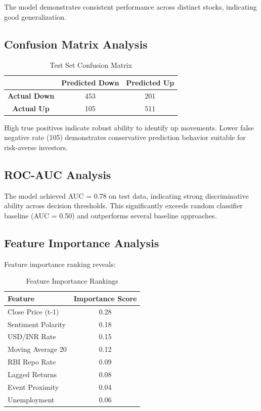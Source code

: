 \documentclass[conference]{IEEEtran}
\begin{document}
The model demonstrates consistent performance across distinct stocks, indicating good generalization.

\subsection{Confusion Matrix Analysis}

\begin{table}[!h]
\centering
\begin{tabular}{c|cc}
& \textbf{Predicted Down} & \textbf{Predicted Up} \\
\midrule
\textbf{Actual Down} & 453 & 201 \\
\textbf{Actual Up} & 105 & 511 \\
\end{tabular}
\caption{Test Set Confusion Matrix}
\label{tab:confusion}
\end{table}

High true positives indicate robust ability to identify up movements. Lower false negative rate (105) demonstrates conservative prediction behavior suitable for risk-averse investors.

\subsection{ROC-AUC Analysis}

The model achieved AUC = 0.78 on test data, indicating strong discriminative ability across decision thresholds. This significantly exceeds random classifier baseline (AUC = 0.50) and outperforms several baseline approaches.

\subsection{Feature Importance Analysis}

Feature importance ranking reveals:

\begin{table}[!h]
\centering
\begin{tabular}{lc}
\toprule
\textbf{Feature} & \textbf{Importance Score} \\
\midrule
Close Price (t-1) & 0.28 \\
Sentiment Polarity & 0.18 \\
USD/INR Rate & 0.15 \\
Moving Average 20 & 0.12 \\
RBI Repo Rate & 0.09 \\
Lagged Returns & 0.08 \\
Event Proximity & 0.04 \\
Unemployment & 0.06 \\
\bottomrule
\end{tabular}
\caption{Feature Importance Rankings}
\label{tab:importance}
\end{table}
\end{document}
